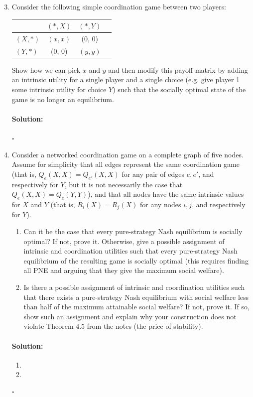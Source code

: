 \documentclass[11pt,letterpaper]{article}
\newif \iftemplate \templatetrue
\newenvironment{solution}{\paragraph{Solution:}}{\hfill$\square$}
\theoremstyle{definition}
\begin{document}
\begin{enumerate}
\setcounter{enumi}{2}
\item Consider the following simple coordination game between two players:
\begin{center}
\begin{tabular}{|l|c|c|c|}
\hline
 & $(*, X)$ & $(*, Y)$\\
\hline
$(X, *)$ & $(x, x)$ & (0, 0)\\
\hline
$(Y, *)$ & (0, 0) & $(y, y)$\\
\hline
\end{tabular}
\end{center}
Show how we can pick $x$ and $y$ and then modify this payoff matrix by adding an intrinsic utility for a single player and a single choice (e.g. give player 1 some intrinsic utility for choice $Y$) such that the socially optimal state of the game is no longer an equilibrium.

\iftemplate
\begin{solution}
\end{solution}
\newpage
\fi

\item Consider a networked coordination game on a complete graph of five nodes. Assume for simplicity that all edges represent the same coordination game (that is, $Q_e (X, X) = Q_{e'} (X, X)$ for any pair of edges $e, e'$, and respectively for $Y$, but it is not necessarily the case that $Q_e (X, X) = Q_e (Y, Y)$), and that all nodes have the same intrinsic values for $X$ and $Y$ (that is, $R_i (X) = R_j (X)$ for any nodes $i, j$, and respectively for $Y$).
\begin{enumerate}
\item Can it be the case that every pure-strategy Nash equilibrium is socially optimal? If not, prove it. Otherwise, give a possible assignment of intrinsic and coordination utilities such that every pure-strategy Nash equilibrium of the resulting game is socially optimal (this requires finding all PNE and arguing that they give the maximum social welfare).

\item Is there a possible assignment of intrinsic and coordination utilities such that there exists a pure-strategy Nash equilibrium with social welfare less than half of the maximum attainable social welfare? If not, prove it. If so, show such an assignment and explain why your construction does not violate Theorem 4.5 from the notes (the price of stability). 
\end{enumerate}
\iftemplate
\begin{solution}
\begin{enumerate}[label=(\alph*)]
\item 
\item 
\end{enumerate}
\end{solution}
\newpage
\fi

\end{enumerate}
\end{document}
